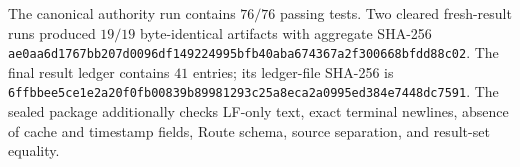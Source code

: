 The canonical authority run contains $76/76$ passing tests.  Two cleared
fresh-result runs produced $19/19$ byte-identical artifacts with aggregate
SHA-256
\nolinkurl{ae0aa6d1767bb207d0096df149224995bfb40aba674367a2f300668bfdd88c02}.
The final result ledger contains $41$ entries; its ledger-file SHA-256 is
\nolinkurl{6ffbbee5ce1e2a20f0fb00839b89981293c25a8eca2a0995ed384e7448dc7591}.
The sealed package additionally checks LF-only text, exact terminal newlines,
absence of cache and timestamp fields, Route schema, source separation, and
result-set equality.
